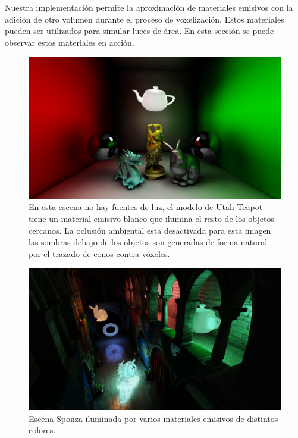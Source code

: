 Nuestra implementación permite la aproximación de materiales emisivos con la adición de otro volumen durante el proceso de voxelización. Estos materiales pueden ser utilizados para simular luces de área. En esta sección se puede observar estos materiales en acción.

\begin{figure}[H]
	\centering
	\includegraphics[width=\linewidth]{media/finals/area_teapot.png}
	\caption{En esta escena no hay fuentes de luz, el modelo de Utah Teapot tiene un material emisivo blanco que ilumina el resto de los objetos cercanos. La oclusión ambiental esta desactivada para esta imagen las sombras debajo de los objetos son generadas de forma natural por el trazado de conos contra vóxeles.}
	\label{fig:areapot}
\end{figure}

\begin{figure}[H]
	\centering
	\includegraphics[width=\linewidth]{media/finals/area_sponza.png}
	\caption{Escena Sponza iluminada por varios materiales emisivos de distintos colores.}
	\label{fig:areasponza}
\end{figure}

